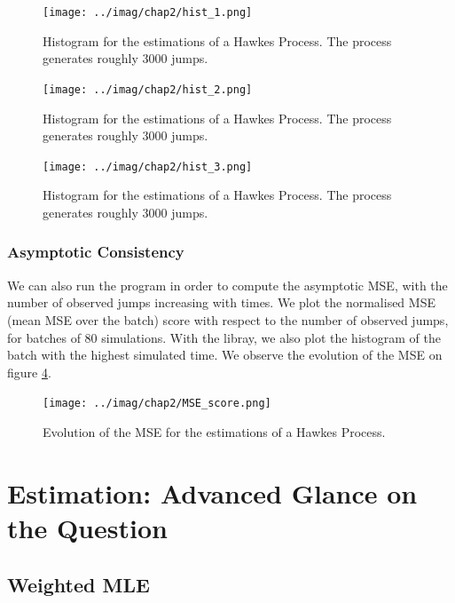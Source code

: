 \documentclass[11pt]{book}
\begin{document}
\begin{figure}
\centering
\texttt{[image: ../imag/chap2/hist\_1.png]}
\caption{Histogram for the estimations of a Hawkes Process. The process generates roughly 3000 jumps.}
\label{fig:hist_1_alpha}
\end{figure}


\begin{figure}
\centering
\texttt{[image: ../imag/chap2/hist\_2.png]}
\caption{Histogram for the estimations of a Hawkes Process. The process generates roughly 3000 jumps.}
\label{fig:hist_1_beta}
\end{figure}


\begin{figure}
\centering
\texttt{[image: ../imag/chap2/hist\_3.png]}
\caption{Histogram for the estimations of a Hawkes Process. The process generates roughly 3000 jumps.}
\label{fig:hist_1_nu}
\end{figure}


\subsection{Asymptotic Consistency}

We can also run the program in order to compute the asymptotic MSE, with the number of observed jumps increasing with times. We plot the normalised MSE (mean MSE over the batch) score with respect to the number of observed jumps, for batches of 80 simulations. With the libray, we also plot the histogram of the batch with the highest simulated time. We observe the evolution of the MSE on figure \ref{fig:MSE_1}.





\begin{figure}
\centering
\texttt{[image: ../imag/chap2/MSE\_score.png]}
\caption{Evolution of the MSE for the estimations of a Hawkes Process.}
\label{fig:MSE_1}
\end{figure}








\chapter{Estimation: Advanced Glance on the Question}
\section{Weighted MLE}
\end{document}
